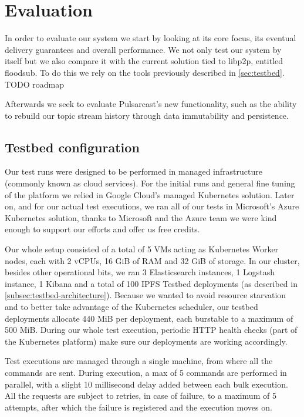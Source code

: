 
\chapter{Evaluation}
\label{chapter:evaluation}

In order to evaluate our system we start by looking at its core focus, its
eventual delivery guarantees and overall performance. We not only test our
system by itself but we also compare it with the current solution tied to
libp2p, entitled floodsub. To do this we rely on the tools previously described
in \ref{sec:testbed}. 
TODO roadmap

Afterwards we seek to evaluate  Pulsarcast's new functionality, such as the
ability to rebuild our topic stream history through data immutability and
persistence.

\section{Testbed configuration}\label{testbed-configuration}

Our test runs were designed to be performed in managed infrastructure (commonly
known as cloud services). For the initial runs and general fine tuning of the
platform we relied in Google Cloud's managed Kubernetes solution. Later on, and
for our actual test executions, we ran all of our tests in Microsoft's Azure
Kubernetes solution, thanks to Microsoft and the Azure team we were kind enough
to support our efforts and offer us free credits.

Our whole setup consisted of a total of 5 VMs acting as Kubernetes Worker
nodes, each with 2 vCPUs, 16 GiB of RAM and 32 GiB of storage. In our cluster,
besides other operational bits, we ran 3 Elasticsearch instances, 1 Logstash
instance, 1 Kibana and a total of 100 IPFS Testbed deployments (as described in
\ref{subsec:testbed-architecture}). Because we wanted to avoid resource
starvation and to better take advantage of the Kubernetes scheduler, our
testbed deployments allocate 440 MiB per deployment, each burstable to a
maximum of 500 MiB. During our whole test execution, periodic HTTP health
checks (part of the Kubernetes platform) make sure our deployments are working
accordingly.

Test executions are managed through a single machine, from where all the
commands are sent. During execution, a max of 5 commands are performed in
parallel, with a slight 10 millisecond delay added between each bulk
execution. All the requests are subject to retries, in case of failure, to a
maximum of 5 attempts, after which the failure is registered and the execution
moves on.


